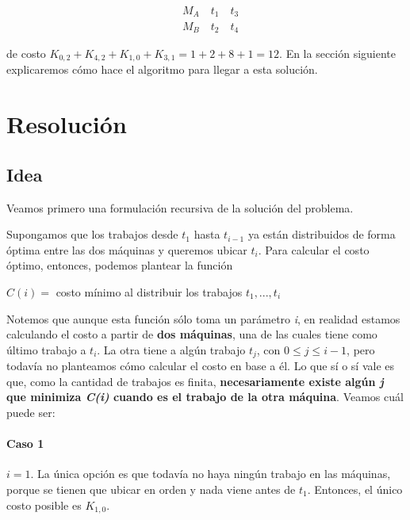 \documentclass[a4paper]{report}
\begin{document}
\begin{equation*}
    \begin{aligned}
        & M_{A} \quad t_{1} \quad t_{3} \\
        & M_{B} \quad t_{2} \quad t_{4}
    \end{aligned}
\end{equation*}

\medskip

de costo $K_{0,2} + K_{4,2} + K_{1,0} + K_{3,1} = 1 + 2 + 8 + 1 = 12$. En la sección siguiente explicaremos cómo hace el algoritmo para llegar a esta solución.

\section{Resolución}

\subsection{Idea}

Veamos primero una formulación recursiva de la solución del problema.

Supongamos que los trabajos desde $t_{1}$ hasta $t_{i-1}$ ya están distribuidos de forma óptima entre las dos máquinas y queremos ubicar $t_{i}$.
Para calcular el costo óptimo, entonces, podemos plantear la función

\begin{center}
    $C(i) = $ costo mínimo al distribuir los trabajos $t_{1},...,t_{i}$
\end{center}

Notemos que aunque esta función sólo toma un parámetro \textit{i}, en realidad estamos calculando el costo a partir de \textbf{dos máquinas}, una de las cuales tiene como último trabajo a $t_{i}$. La otra tiene a algún trabajo $t_{j}$, con $0 \leq j \leq i-1$, pero todavía no planteamos cómo calcular el costo en base a él. Lo que sí o sí vale es que, como la cantidad de trabajos es finita, \textbf{necesariamente existe algún \textit{j} que minimiza \textit{C(i)} cuando es el trabajo de la otra máquina}. Veamos cuál puede ser: 

\paragraph{Caso 1} $i=1$. La única opción es que todavía no haya ningún trabajo en las máquinas, porque se tienen que ubicar en orden y nada viene antes de $t_{1}$. Entonces, el único costo posible es $K_{1,0}$.
\end{document}
